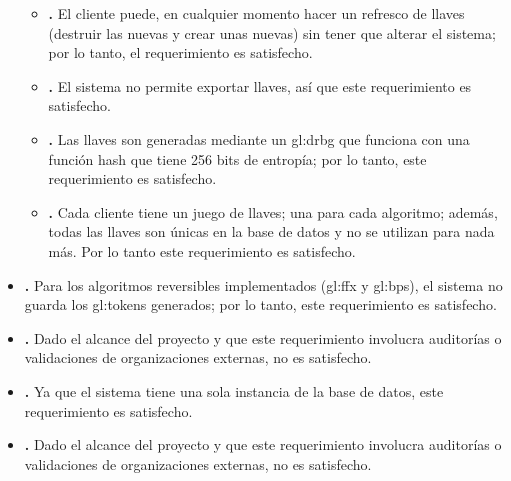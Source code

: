 \begin{itemize}
\begin{itemize}
      \item \textbf{.}
        El cliente puede, en cualquier momento hacer un refresco de llaves
        (destruir las nuevas y crear unas nuevas) sin tener que alterar el
        sistema; por lo tanto, el requerimiento es satisfecho.

      \item \textbf{.}
        El sistema no permite exportar llaves, así que este requerimiento
        es satisfecho.

      \item \textbf{.}
        Las llaves son generadas mediante un \acrshort{gl:drbg} que funciona
        con una función hash que tiene 256 bits de entropía; por lo tanto, este
        requerimiento es satisfecho.

      \item \textbf{.}
        Cada cliente tiene un juego de llaves; una para cada algoritmo; además,
        todas las llaves son únicas en la base de datos y no se utilizan para
        nada más. Por lo tanto este requerimiento es satisfecho.

    \end{itemize}

  \item \textbf{.}
    Para los algoritmos reversibles implementados (\acrshort{gl:ffx} y
    \acrshort{gl:bps}), el sistema no guarda los \glspl{gl:token} generados;
    por lo tanto, este requerimiento es satisfecho.

  \item \textbf{.}
    Dado el alcance del proyecto y que este requerimiento involucra auditorías
    o validaciones de organizaciones externas, no es satisfecho.

  \item \textbf{.}
    Ya que el sistema tiene una sola instancia de la base de datos, este
    requerimiento es satisfecho.

  \item \textbf{.}
    Dado el alcance del proyecto y que este requerimiento involucra auditorías
    o validaciones de organizaciones externas, no es satisfecho.


\end{itemize}
